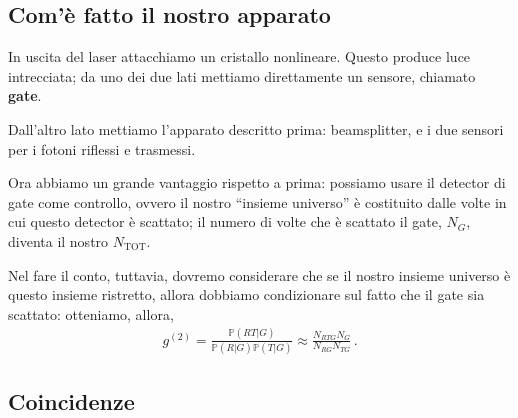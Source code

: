 \documentclass[a4paper,12pt]{article}
\begin{document}
\subsection{Com'è fatto il nostro apparato}



In uscita del laser attacchiamo un cristallo nonlineare. 
Questo produce luce intrecciata; da uno dei due lati mettiamo direttamente un sensore, chiamato \textbf{gate}. 

Dall'altro lato mettiamo l'apparato descritto prima: beamsplitter, e i due sensori per i fotoni riflessi e trasmessi.


Ora abbiamo un grande vantaggio rispetto a prima: possiamo usare il detector di gate come controllo, ovvero il nostro ``insieme universo'' è costituito dalle volte in cui questo detector è scattato; il numero di volte che è scattato il gate, \(N_G\), diventa il nostro \(N _{\text{TOT}} \).

Nel fare il conto, tuttavia, dovremo considerare che se il nostro insieme universo è questo insieme ristretto, allora dobbiamo condizionare sul fatto che il gate sia scattato: otteniamo, allora, 
%
\begin{align}
g^{(2)} = \frac{\mathbb{P}(RT | G)}{\mathbb{P}(R|G) \mathbb{P}(T|G)}
\approx \frac{N_{RTG} N_G}{N_{RG} N_{TG}}
\,.
\end{align}

\subsection{Coincidenze}
\end{document}

